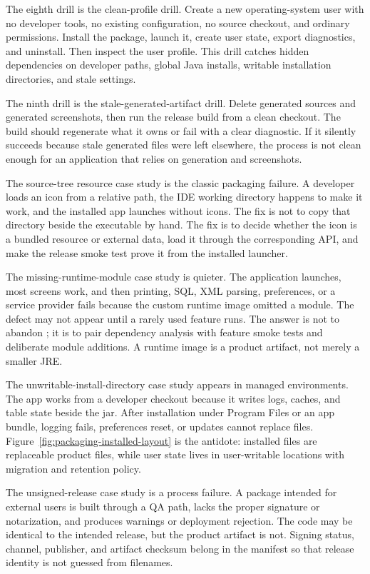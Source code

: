 The eighth drill is the clean-profile drill. Create a new operating-system user with no developer tools, no existing configuration, no source checkout, and ordinary permissions. Install the package, launch it, create user state, export diagnostics, and uninstall. Then inspect the user profile. This drill catches hidden dependencies on developer paths, global Java installs, writable installation directories, and stale settings.

The ninth drill is the stale-generated-artifact drill. Delete generated sources and generated screenshots, then run the release build from a clean checkout. The build should regenerate what it owns or fail with a clear diagnostic. If it silently succeeds because stale generated files were left elsewhere, the process is not clean enough for an application that relies on generation and screenshots.

The source-tree resource case study is the classic packaging failure. A developer loads an icon from a relative path, the IDE working directory happens to make it work, and the installed app launches without icons. The fix is not to copy that directory beside the executable by hand. The fix is to decide whether the icon is a bundled resource or external data, load it through the corresponding API, and make the release smoke test prove it from the installed launcher.

The missing-runtime-module case study is quieter. The application launches, most screens work, and then printing, SQL, XML parsing, preferences, or a service provider fails because the custom runtime image omitted a module. The defect may not appear until a rarely used feature runs. The answer is not to abandon ; it is to pair dependency analysis with feature smoke tests and deliberate module additions. A runtime image is a product artifact, not merely a smaller JRE.

The unwritable-install-directory case study appears in managed environments. The app works from a developer checkout because it writes logs, caches, and table state beside the jar. After installation under Program Files or an app bundle, logging fails, preferences reset, or updates cannot replace files. Figure~\ref{fig:packaging-installed-layout} is the antidote: installed files are replaceable product files, while user state lives in user-writable locations with migration and retention policy.

The unsigned-release case study is a process failure. A package intended for external users is built through a QA path, lacks the proper signature or notarization, and produces warnings or deployment rejection. The code may be identical to the intended release, but the product artifact is not. Signing status, channel, publisher, and artifact checksum belong in the manifest so that release identity is not guessed from filenames.

